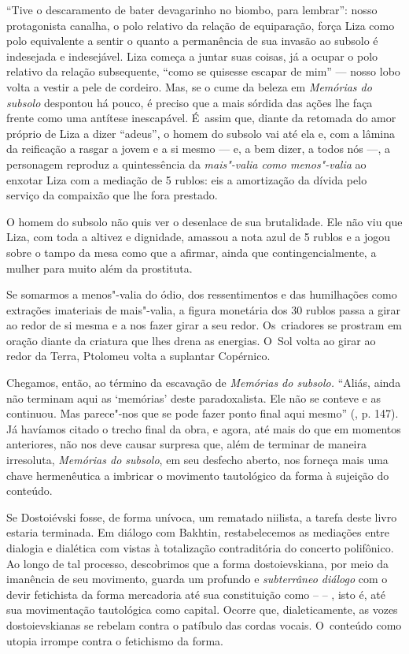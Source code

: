 ``Tive o descaramento de bater devagarinho no biombo, para lembrar'':
nosso protagonista canalha, o polo relativo da relação de equiparação,
força Liza como polo equivalente a sentir o quanto a permanência de sua
invasão ao subsolo é indesejada e indesejável. Liza começa a juntar suas
coisas, já a ocupar o polo relativo da relação subsequente, ``como se
quisesse escapar de mim'' --- nosso lobo volta a vestir a pele de
cordeiro. Mas, se o cume da beleza em \emph{Memórias do subsolo}
despontou há pouco, é preciso que a mais sórdida das ações lhe faça
frente como uma antítese inescapável. É~assim que, diante da retomada do
amor próprio de Liza a dizer ``adeus'', o homem do subsolo vai até ela
e, com a lâmina da reificação a rasgar a jovem e a si mesmo --- e, a bem
dizer, a todos nós ---, a personagem reproduz a quintessência da
\emph{mais"-valia como menos"-valia} ao enxotar Liza com a mediação de 5
rublos: eis a amortização da dívida pelo serviço da compaixão que lhe
fora prestado.

O homem do subsolo não quis ver o desenlace de sua brutalidade. Ele não
viu que Liza, com toda a altivez e dignidade, amassou a nota azul de 5
rublos e a jogou sobre o tampo da mesa como que a afirmar, ainda que
contingencialmente, a mulher para muito além da prostituta.

Se somarmos a menos"-valia do ódio, dos ressentimentos e das humilhações
como extrações imateriais de mais"-valia, a figura monetária dos 30
rublos passa a girar ao redor de si mesma e a nos fazer girar a seu
redor. Os~criadores se prostram em oração diante da criatura que lhes
drena as energias. O~Sol volta ao girar ao redor da Terra, Ptolomeu
volta a suplantar Copérnico.

Chegamos, então, ao término da escavação de \emph{Memórias do subsolo.}
``Aliás, ainda não terminam aqui as `memórias' deste paradoxalista. Ele
não se conteve e as continuou. Mas parece"-nos que se pode fazer ponto
final aqui mesmo'' (, p. 147). Já havíamos citado o trecho final da
obra, e agora, até mais do que em momentos anteriores, não nos deve
causar surpresa que, além de terminar de maneira irresoluta,
\emph{Memórias do subsolo}, em seu desfecho aberto, nos forneça mais uma
chave hermenêutica a imbricar o movimento tautológico da forma à
sujeição do conteúdo.

Se Dostoiévski fosse, de forma unívoca, um rematado niilista, a tarefa
deste livro estaria terminada. Em diálogo com Bakhtin, restabelecemos as
mediações entre dialogia e dialética com vistas à totalização
contraditória do concerto polifônico. Ao longo de tal processo,
descobrimos que a forma dostoievskiana, por meio da imanência de seu
movimento, guarda um profundo e \emph{subterrâneo diálogo} com o devir
fetichista da forma mercadoria até sua constituição como  --  -- ,
isto é, até sua movimentação tautológica como capital. Ocorre que,
dialeticamente, as vozes dostoievskianas se rebelam contra o patíbulo
das cordas vocais. O~conteúdo como utopia irrompe contra o fetichismo da
forma.

